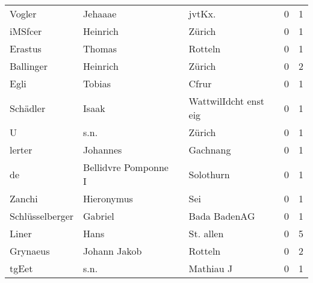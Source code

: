 \begin{tabular}{llllrr}
                   Vogler &                            Jehaaae &             &                                     jvtKx.  &          0 &         1 \\
                  iMSfcer &                           Heinrich &             &                                      Zürich &          0 &         1 \\
                  Erastus &                             Thomas &             &                                     Rotteln &          0 &         1 \\
                Ballinger &                           Heinrich &             &                                      Zürich &          0 &         2 \\
                     Egli &                             Tobias &             &                                       Cfrur &          0 &         1 \\
                 Schädler &                              Isaak &             &                       WattwilIdcht enst eig &          0 &         1 \\
                        U &                               s.n. &             &                                      Zürich &          0 &         1 \\
                   lerter &                           Johannes &             &                                    Gachnang &          0 &         1 \\
                       de &               Bellidvre Pomponne I &             &                                   Solothurn &          0 &         1 \\
                   Zanchi &                         Hieronymus &             &                                         Sei &          0 &         1 \\
          Schlüsselberger &                            Gabriel &             &                                Bada BadenAG &          0 &         1 \\
                    Liner &                               Hans &             &                                   St. allen &          0 &         5 \\
                 Grynaeus &                       Johann Jakob &             &                                     Rotteln &          0 &         2 \\
                    tgEet &                               s.n. &             &                                   Mathiau J &          0 &         1 \\

\end{tabular}
